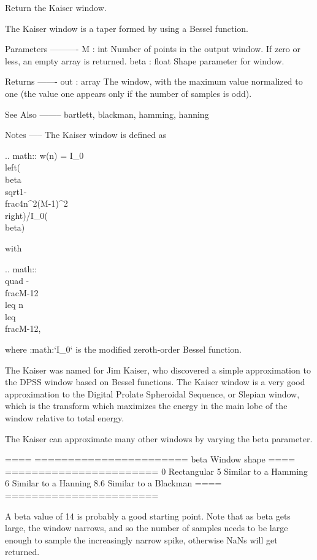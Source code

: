 \begin{DoxyVerb}Return the Kaiser window.

The Kaiser window is a taper formed by using a Bessel function.

Parameters
----------
M : int
    Number of points in the output window. If zero or less, an
    empty array is returned.
beta : float
    Shape parameter for window.

Returns
-------
out : array
    The window, with the maximum value normalized to one (the value
    one appears only if the number of samples is odd).

See Also
--------
bartlett, blackman, hamming, hanning

Notes
-----
The Kaiser window is defined as

.. math::  w(n) = I_0\\left( \\beta \\sqrt{1-\\frac{4n^2}{(M-1)^2}}
           \\right)/I_0(\\beta)

with

.. math:: \\quad -\\frac{M-1}{2} \\leq n \\leq \\frac{M-1}{2},

where :math:`I_0` is the modified zeroth-order Bessel function.

The Kaiser was named for Jim Kaiser, who discovered a simple
approximation to the DPSS window based on Bessel functions.  The Kaiser
window is a very good approximation to the Digital Prolate Spheroidal
Sequence, or Slepian window, which is the transform which maximizes the
energy in the main lobe of the window relative to total energy.

The Kaiser can approximate many other windows by varying the beta
parameter.

====  =======================
beta  Window shape
====  =======================
0     Rectangular
5     Similar to a Hamming
6     Similar to a Hanning
8.6   Similar to a Blackman
====  =======================

A beta value of 14 is probably a good starting point. Note that as beta
gets large, the window narrows, and so the number of samples needs to be
large enough to sample the increasingly narrow spike, otherwise NaNs will
get returned.


\end{DoxyVerb}
